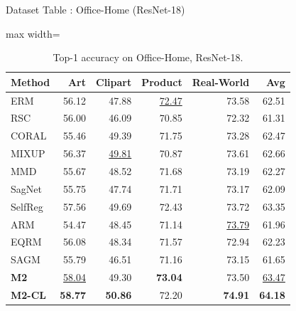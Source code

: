 \documentclass[t, aspectratio=169]{beamer} %
\begin{document}

\begin{frame}{Dataset Table : Office-Home (ResNet-18)}
\begin{table}[htbp]
\centering
\caption{Top-1 accuracy on Office-Home, ResNet-18.}
\scriptsize
\begin{adjustbox}{max width=\textwidth}
\begin{tabular}{lrrrrr}
\toprule
Method & Art & Clipart & Product & Real-World & Avg \\
\midrule
ERM & 56.12 & 47.88 & \underline{72.47} & 73.58 & 62.51 \\
RSC & 56.00 & 46.09 & 70.85 & 72.32 & 61.31 \\
CORAL & 55.46 & 49.39 & 71.75 & 73.28 & 62.47 \\
MIXUP & 56.37 & \underline{49.81} & 70.87 & 73.61 & 62.66 \\
MMD & 55.67 & 48.52 & 71.68 & 73.19 & 62.27 \\
SagNet & 55.75 & 47.74 & 71.71 & 73.17 & 62.09 \\
SelfReg & 57.56 & 49.69 & 72.43 & 73.72 & 63.35 \\
ARM & 54.47 & 48.45 & 71.14 & \underline{73.79} & 61.96 \\
EQRM & 56.08 & 48.34 & 71.57 & 72.94 & 62.23 \\
SAGM & 55.79 & 46.51 & 71.16 & 73.15 & 61.65 \\
\midrule
\textbf{M2} & \underline{58.04} & 49.30 & \textbf{73.04} & 73.50 & \underline{63.47} \\
\textbf{M2-CL} & \textbf{58.77} & \textbf{50.86} & 72.20 & \textbf{74.91} & \textbf{64.18} \\
\bottomrule
\end{tabular}
\end{adjustbox}
\end{table}
	\end{frame}
\end{document}
